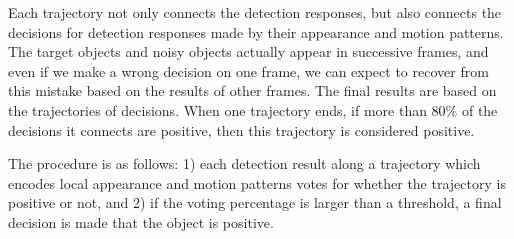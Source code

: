 Each trajectory not only connects the detection responses, but also connects the decisions for detection responses made by their appearance and motion patterns. The target objects and noisy objects actually appear in successive frames, and even if we make a wrong decision on one frame, we can expect to recover from this mistake based on the results of other frames. The final results are based on the trajectories of decisions. When one trajectory ends, if more than 80\% of the decisions it connects are positive, then this trajectory is considered positive.


The procedure is as follows: 1) each detection result along a trajectory which encodes local appearance and motion patterns votes for whether the trajectory is positive or not, and 2) if the voting percentage is larger than a threshold, a final decision is made that the object is positive.

